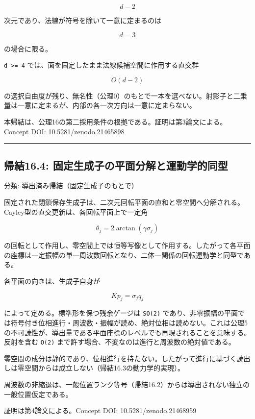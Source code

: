 \documentclass[
  a4paper,
]{ltjsarticle}
\begin{document}
\[
d-2
\]

次元であり、法線が符号を除いて一意に定まるのは

\[
d=3
\]

の場合に限る。

\texttt{d\ \textgreater{}=\ 4}
では、面を固定したまま法線候補空間に作用する直交群

\[
O(d-2)
\]

の選択自由度が残り、無名性（公理0）のもとで一本を選べない。射影子と二乗量は一意に定まるが、内部の各一次方向は一意に定まらない。

本帰結は、公理16の第二採用条件の根拠である。証明は第3論文による。Concept
DOI: 10.5281/zenodo.21465898

\begin{center}\rule{0.5\linewidth}{0.5pt}\end{center}

\subsection{帰結16.4:
固定生成子の平面分解と運動学的同型}\label{ux5e30ux7d5016.4-ux56faux5b9aux751fux6210ux5b50ux306eux5e73ux9762ux5206ux89e3ux3068ux904bux52d5ux5b66ux7684ux540cux578b}

分類: 導出済み帰結（固定生成子のもとで）

固定された閉鎖保存生成子は、二次元回転平面の直和と零空間へ分解される。Cayley型の直交更新は、各回転平面上で一定角

\[
\theta_j=2\arctan(\gamma\sigma_j)
\]

の回転として作用し、零空間上では恒等写像として作用する。したがって各平面の座標は一定振幅の単一周波数回転となり、二体一関係の回転運動学と同型である。

各平面の向きは、生成子自身が

\[
Kp_j=\sigma_j q_j
\]

によって定める。標準形を保つ残余ゲージは \texttt{SO(2)}
であり、非零振幅の平面では符号付き位相進行・周波数・振幅が読め、絶対位相は読めない。これは公理5の不可読性が、導出量である平面座標のレベルでも再現されることを意味する。反射を含む
\texttt{O(2)} まで許す場合、不変なのは進行と周波数の絶対値である。

零空間の成分は静的であり、位相進行を持たない。したがって進行に基づく読出しは零空間からは成立しない（帰結16.3の動力学的実現）。

周波数の非縮退は、一般位置ランク等号（帰結16.2）からは導出されない独立の一般位置仮定である。

証明は第4論文による。Concept DOI: 10.5281/zenodo.21468959
\end{document}
